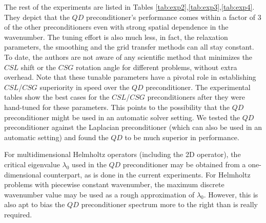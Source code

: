 \documentclass[mathpazo]{cicp}
\theoremstyle{definition}
\numberwithin{equation}{section}
\providecommand{\hbz}{}
\begin{document}
The rest of the experiments are listed in Tables \ref{tab:exp2},\ref{tab:exp3},\ref{tab:exp4}. They depict that the $QD$ preconditioner's performance comes within a factor of 3 of the other preconditioners even with strong spatial dependence in the wavenumber. The tuning effort is also much less, in fact, the relaxation parameters, the smoothing and the grid transfer methods can all stay constant. \hbz{To date, the authors are not aware of any scientific method that minimizes the $CSL$ shift or the $CSG$ rotation angle for different problems, without extra overhead. Note that these tunable parameters have a pivotal role in establishing $CSL$/$CSG$ superiority in speed over the $QD$ preconditioner. The experimental tables show the best cases for the $CSL$/$CSG$ preconditioners after they were hand-tuned for these parameters.} This points to the possibility that the $QD$ preconditioner might be used in an automatic solver setting. We tested the $QD$ preconditioner against the Laplacian preconditioner \hbz{(which can also be used in an automatic setting)} and found the $QD$ to be much superior in performance.

For multidimensional Helmholtz operators (including the 2D operator), the critical eigenvalue $\lambda_0$ used in the $QD$ preconditioner may be obtained from a one-dimensional counterpart, as is done in the current experiments. For Helmholtz problems with piecewise constant wavenumber, the maximum discrete wavenumber value may be used as a rough approximation of $\lambda_0$. However, this is also apt to bias the $QD$ preconditioner spectrum more to the right than is really required.
\end{document}
